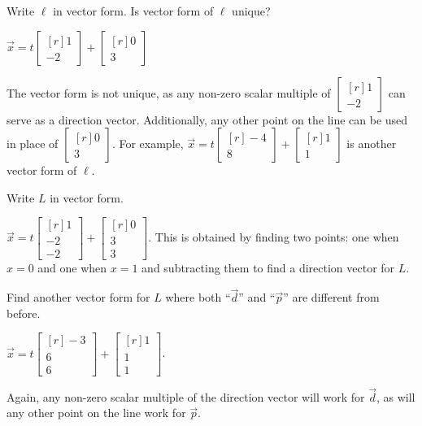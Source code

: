 \documentclass{problemset}
\newcommand{\mat}[1]{\begin{bmatrix*}[r]#1\end{bmatrix*}}
\begin{document}
	\begin{parts}
		\item Write $\ell$ in vector form. Is vector form of $\ell$ unique?
			\begin{solution}
				$\vec x = t \mat{1 \\ -2} + \mat{0 \\ 3}$

				The vector form is not unique, as any non-zero scalar multiple of 
				$\mat{1 \\ -2}$ can serve as a direction vector. Additionally, 
				any other point on the line can be used in place of 
				$\mat{0 \\3}$. For example,  $\vec x = t \mat{-4 \\ 8} + \mat{1 \\ 1}$
				is another vector form of $\ell$.
			\end{solution}
		\item Write $L$ in vector form.
			\begin{solution}[inline]
				$\vec x = t\mat{1 \\ -2 \\ -2} + \mat{0 \\ 3 \\ 3}$. This is obtained
				by finding two points: one when $x=0$ and one when $x=1$ and subtracting
				them to find a direction vector for $L$.
			\end{solution}
		\item Find another vector form for $L$ where both ``$\vec d$'' and
			``$\vec p$'' are different from before.
			\begin{solution}
				$\vec x = t \mat{-3 \\ 6 \\ 6} + \mat{1 \\ 1 \\ 1}$.

				Again, any non-zero scalar multiple of the direction vector 
				will work for $\vec d$, as will any other point on the line 
				work for $\vec p$. 
			\end{solution}
	\end{parts}
\end{document}
